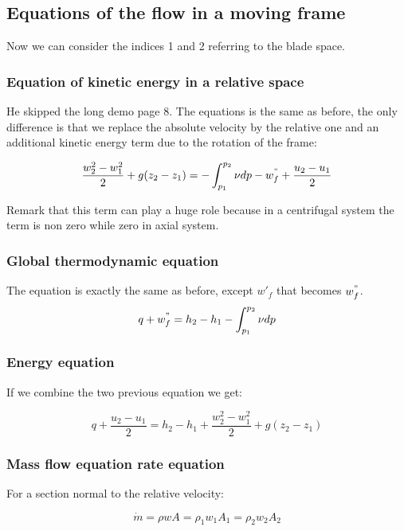 \subsection{Equations of the flow in a moving frame}
Now we can consider the indices 1 and 2 referring to the blade space. 

\subsubsection{Equation of kinetic energy in a relative space}
He skipped the long demo page 8. The equations is the same as before, the only difference is that we replace the absolute velocity by the relative one and an additional kinetic energy term due to the rotation of the frame: 

\begin{equation}
 \frac{w_2^2 - w_1^2}{2} + g(z_2-z_1) = - \int _{p_1}^{p_2} \nu dp - w^"_f + \frac{u_2-u_1}{2}
 \label{2.5}
\end{equation}

Remark that this term can play a huge role because in a centrifugal system the term is non zero while zero in axial system. 

\subsubsection{Global thermodynamic equation}
The equation is exactly the same as before, except $w'_f$ that becomes $w^"_f$. 
\begin{equation}
q + w^"_f = h_2 - h_1 - \int _{p_1}^{p_2} \nu dp
\end{equation}

\subsubsection{Energy equation}
If we combine the two previous equation we get: 

\begin{equation}
q + \frac{u_2-u_1}{2} = h_2 - h_1 + \frac{w_2^2 - w_1^2}{2} + g(z_2-z_1)
\end{equation}

\subsubsection{Mass flow equation rate equation}
For a section normal to the relative velocity:

\begin{equation}
\dot{m} = \rho w A = \rho _1 w_1 A_1 = \rho _2 w_2 A_2
\end{equation}


